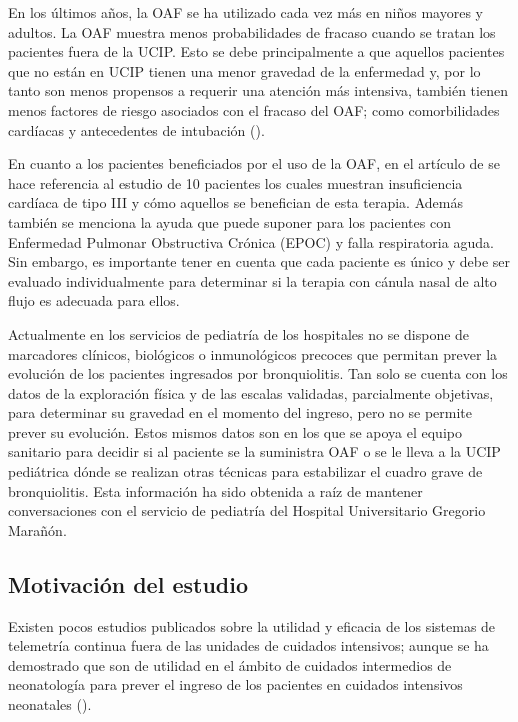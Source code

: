 En los últimos años, la OAF se ha utilizado cada vez más en niños mayores y adultos. La OAF muestra menos probabilidades de fracaso cuando se tratan los pacientes fuera de la UCIP. Esto se debe principalmente a que aquellos pacientes que no están en UCIP tienen una menor gravedad de la enfermedad y, por lo tanto son menos propensos a requerir una atención más intensiva, también tienen menos factores de riesgo asociados con el fracaso del OAF; como comorbilidades cardíacas y antecedentes de intubación (\cite{Betters2017}). 

En cuanto a los pacientes beneficiados por el uso de la OAF, en el artículo de \cite{Lodeserto2018} se hace referencia al estudio de 10 pacientes los cuales muestran insuficiencia cardíaca de tipo III y cómo aquellos se benefician de esta terapia. Además también se menciona la ayuda que puede suponer para los pacientes con Enfermedad Pulmonar Obstructiva Crónica (EPOC) y falla respiratoria aguda. Sin embargo, es importante tener en cuenta que cada paciente es único y debe ser evaluado individualmente para determinar si la terapia con cánula nasal de alto flujo es adecuada para ellos.

Actualmente en los servicios de pediatría de los hospitales no se dispone de marcadores clínicos, biológicos o inmunológicos precoces que permitan prever la evolución de los pacientes ingresados por bronquiolitis. Tan solo se cuenta con los datos de la exploración física y de las escalas validadas, parcialmente objetivas, para determinar su gravedad en el momento del ingreso, pero no se permite prever su evolución. Estos mismos datos son en los que se apoya el equipo sanitario para decidir si al paciente se la suministra OAF o se le lleva a la UCIP pediátrica dónde se realizan otras técnicas para estabilizar el cuadro grave de bronquiolitis. Esta información ha sido obtenida a raíz de mantener conversaciones con el servicio de pediatría del Hospital Universitario Gregorio Marañón.


\subsection{Motivación del estudio}

Existen pocos estudios publicados sobre la utilidad y eficacia de los sistemas de telemetría continua fuera de las unidades de cuidados intensivos; aunque se ha demostrado que son de utilidad en el ámbito de cuidados intermedios de neonatología para prever el ingreso de los pacientes en cuidados intensivos neonatales (\cite{Solis2022}).

